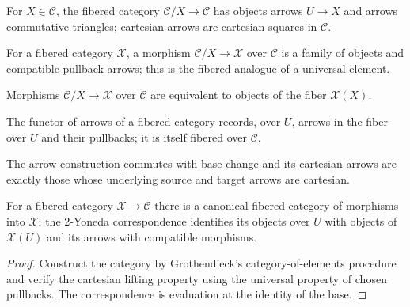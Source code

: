 \begin{definition}\label{fga-def-3-29}
For $X\in\mathcal C$, the fibered category $\mathcal C/X\to\mathcal C$ has
objects arrows $U\to X$ and arrows commutative triangles; cartesian arrows are
cartesian squares in $\mathcal C$.
\end{definition}
\begin{definition}\label{fga-def-3-31}
For a fibered category $\mathcal X$, a morphism $\mathcal C/X\to\mathcal X$
over $\mathcal C$ is a family of objects and compatible pullback arrows; this is
the fibered analogue of a universal element.
\end{definition}
\begin{proposition}\label{fga-prop-3-32}
Morphisms $\mathcal C/X\to\mathcal X$ over $\mathcal C$ are equivalent to
objects of the fiber $\mathcal X(X)$.
\end{proposition}
\begin{definition}\label{fga-def-3-33}
The functor of arrows of a fibered category records, over $U$, arrows in the
fiber over $U$ and their pullbacks; it is itself fibered over $\mathcal C$.
\end{definition}
\begin{proposition}\label{fga-prop-3-35}
The arrow construction commutes with base change and its cartesian arrows are
exactly those whose underlying source and target arrows are cartesian.
\end{proposition}
\begin{theorem}\label{fga-thm-3-45}
For a fibered category $\mathcal X\to\mathcal C$ there is a canonical fibered
category of morphisms into $\mathcal X$; the 2-Yoneda correspondence identifies
its objects over $U$ with objects of $\mathcal X(U)$ and its arrows with
compatible morphisms.
\end{theorem}
\begin{proof}
Construct the category by Grothendieck's category-of-elements procedure and
verify the cartesian lifting property using the universal property of chosen
pullbacks.  The correspondence is evaluation at the identity of the base.
\end{proof}

